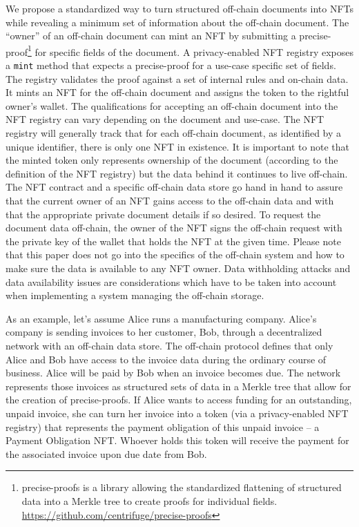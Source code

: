 \documentclass[a4paper, 10pt]{article}
\begin{document}
We propose a standardized way to turn structured off-chain documents into NFTs while revealing a minimum set of information about the off-chain document. The “owner” of an off-chain document can mint an NFT by submitting a precise-proof\footnote{precise-proofs is a library allowing the standardized flattening of structured data into a Merkle tree to create proofs for individual fields. \url{https://github.com/centrifuge/precise-proofs}} for specific fields of the document. A privacy-enabled NFT registry exposes a \texttt{mint} method that expects a precise-proof for a use-case specific set of fields. The registry validates the proof against a set of internal rules and on-chain data. It mints an NFT for the off-chain document and assigns the token to the rightful owner’s wallet. The qualifications for accepting an off-chain document into the NFT registry can vary depending on the document and use-case. The NFT registry will generally track that for each off-chain document, as identified by a unique identifier, there is only one NFT in existence. It is important to note that the minted token only represents ownership of the document (according to the definition of the NFT registry) but the data behind it continues to live off-chain. The NFT contract and a specific off-chain data store go hand in hand to assure that the current owner of an NFT gains access to the off-chain data and with that the appropriate private document details if so desired. To request the document data off-chain, the owner of the NFT signs the off-chain request with the private key of the wallet that holds the NFT at the given time. Please note that this paper does not go into the specifics of the off-chain system and how to make sure the data is available to any NFT owner. Data withholding attacks and data availability issues are considerations which have to be taken into account when implementing a system managing the off-chain storage.

As an example, let’s assume Alice runs a manufacturing company. Alice’s company is sending invoices to her customer, Bob, through a decentralized network with an off-chain data store. The off-chain protocol defines that only Alice and Bob have access to the invoice data during the ordinary course of business. Alice will be paid by Bob when an invoice becomes due. The network represents those invoices as structured sets of data in a Merkle tree that allow for the creation of precise-proofs.
If Alice wants to access funding for an outstanding, unpaid invoice, she can turn her invoice into a token (via a privacy-enabled NFT registry) that represents the payment obligation of this unpaid invoice – a Payment Obligation NFT. Whoever holds this token will receive the payment for the associated invoice upon due date from Bob.
\end{document}
